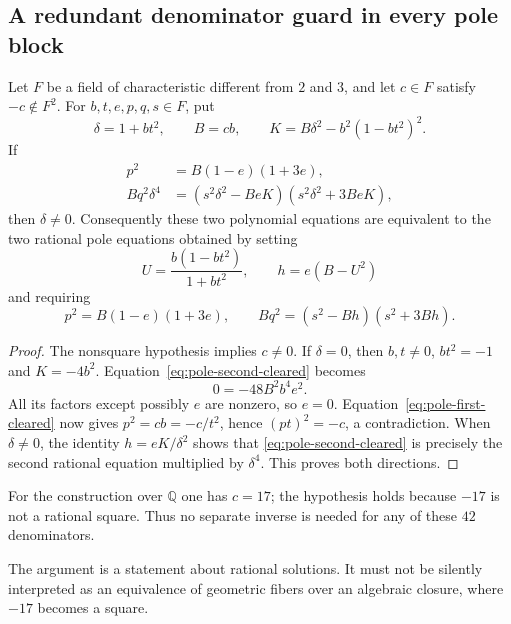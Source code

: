 \subsection{A redundant denominator guard in every pole block}

\begin{lemma}\label{lem:pole-denominator-redundant}
Let $F$ be a field of characteristic different from $2$ and $3$,
and let $c\in F$ satisfy $-c\notin F^2$.
For $b,t,e,p,q,s\in F$, put
\[
 \delta=1+bt^2,\qquad B=cb,\qquad
 K=B\delta^2-b^2(1-bt^2)^2.
\]
If
\begin{align}
 p^2&=B(1-e)(1+3e),\label{eq:pole-first-cleared}\\
 Bq^2\delta^4
   &=(s^2\delta^2-BeK)(s^2\delta^2+3BeK),
       \label{eq:pole-second-cleared}
\end{align}
then $\delta\ne0$.
Consequently these two polynomial equations are equivalent to the
two rational pole equations obtained by setting
\[
 U=\frac{b(1-bt^2)}{1+bt^2},\qquad h=e(B-U^2)
\]
and requiring
\[
 p^2=B(1-e)(1+3e),\qquad
 Bq^2=(s^2-Bh)(s^2+3Bh).
\]
\end{lemma}
\begin{proof}
The nonsquare hypothesis implies $c\ne0$.
If $\delta=0$, then $b,t\ne0$, $bt^2=-1$ and $K=-4b^2$.
Equation~\eqref{eq:pole-second-cleared} becomes
\[
 0=-48 B^2b^4e^2.
\]
All its factors except possibly $e$ are nonzero, so $e=0$.
Equation~\eqref{eq:pole-first-cleared} now gives
$p^2=cb=-c/t^2$, hence $(pt)^2=-c$, a contradiction.
When $\delta\ne0$, the identity $h=eK/\delta^2$ shows that
\eqref{eq:pole-second-cleared} is precisely the second rational
equation multiplied by $\delta^4$.  This proves both directions.
\end{proof}

For the construction over $\mathbb Q$ one has $c=17$; the hypothesis
holds because $-17$ is not a rational square.  Thus no separate inverse
is needed for any of these $42$ denominators.

The argument is a statement about rational solutions.  It must not be
silently interpreted as an equivalence of geometric fibers over an
algebraic closure, where $-17$ becomes a square.

